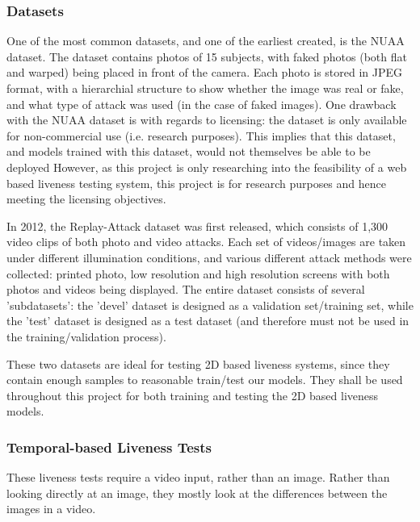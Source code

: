 \documentclass[11pt,a4paper]{article}
\begin{document}
        \subsubsection{Datasets}
        One of the most common datasets, and one of the earliest created, is the NUAA dataset.
        The dataset contains photos of 15 subjects, with faked photos (both flat and warped) being placed in front of the camera.
        Each photo is stored in JPEG format, with a hierarchial structure to show whether the image was real or fake, and what type of
        attack was used (in the case of faked images). One drawback with the NUAA dataset is with regards to licensing: the dataset is only available for
        non-commercial use (i.e. research purposes). This implies that this dataset, and models trained with this dataset, would not themselves be able to be deployed
        \cite{NUAADataset}
        However, as this project is only researching into the feasibility of a web based liveness testing system, this project is for research purposes and hence meeting the
        licensing objectives.

        In 2012, the Replay-Attack dataset was first released, which consists of 1,300 video clips of both photo and video attacks. Each
        set of videos/images are taken under different illumination conditions, and various different attack methods were collected: printed photo, low resolution and high resolution screens with both photos and 
        videos being displayed. The entire dataset consists of several 'subdatasets': the 'devel' dataset is designed as a validation set/training set, while
        the 'test' dataset is designed as a test dataset (and therefore must not be used in the training/validation process). \cite{ReplayAttackDataset}

        These two datasets are ideal for testing 2D based liveness systems, since they contain enough samples to reasonable train/test our models. They shall be used
        throughout this project for both training and testing the 2D based liveness models.

        \subsubsection{Temporal-based Liveness Tests}
        These liveness tests require a video input, rather than an image. Rather than looking directly at an image, they mostly look at the differences between the images in a video.
        
\end{document}

